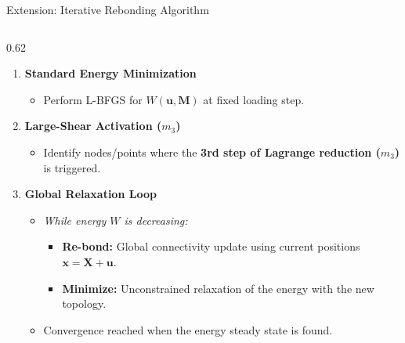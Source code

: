 \documentclass[10pt, aspectratio=169]{beamer}
\begin{document}
\begin{frame}{Extension: Iterative Rebonding Algorithm}
    \begin{columns}[c, onlytextwidth]
        \begin{column}{0.62\textwidth}
            \begin{enumerate}
                \item \textbf{\color{AcademicNavy} Standard Energy Minimization}
                \begin{itemize}
                    \item Perform L-BFGS for $W(\mathbf{u}, \mathbf{M})$ at fixed loading step.
                \end{itemize}
                
                \item \textbf{\color{AcademicNavy} Large-Shear Activation ($m_3$)}
                \begin{itemize}
                    \item Identify nodes/points where the \textbf{3rd step of Lagrange reduction ($m_3$)} is triggered.
                \end{itemize}
                
                \item \textbf{\color{AcademicNavy} Global Relaxation Loop}
                \begin{itemize}
                    \item \textit{While energy $W$ is decreasing:}
                    \begin{itemize}
                        \item \textbf{Re-bond:} Global connectivity update using current positions $\mathbf{x} = \mathbf{X} + \mathbf{u}$.
                        \item \textbf{Minimize:} Unconstrained relaxation of the energy with the new topology.
                    \end{itemize}
                    \item Convergence reached when the energy steady state is found.
                \end{itemize}
            \end{enumerate}
        \end{column}
        

\end{columns}
\end{frame}
\end{document}
